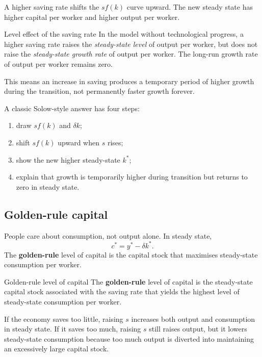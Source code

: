 \documentclass[12pt]{article}
\begin{document}
A higher saving rate shifts the $sf(k)$ curve upward. The new steady state has higher capital per worker and higher output per worker.

\begin{theorem}{Level effect of the saving rate}{}
In the model without technological progress, a higher saving rate raises the \emph{steady-state level} of output per worker, but does not raise the \emph{steady-state growth rate} of output per worker. The long-run growth rate of output per worker remains zero.
\end{theorem}

This means an increase in saving produces a temporary period of higher growth during the transition, not permanently faster growth forever.

\begin{examtip}[title={Exam Focus: High priority for short-answer}]
A classic Solow-style answer has four steps:
\begin{enumerate}[leftmargin=1.5em]
\item draw $sf(k)$ and $\delta k$;
\item shift $sf(k)$ upward when $s$ rises;
\item show the new higher steady-state $k^*$;
\item explain that growth is temporarily higher during transition but returns to zero in steady state.
\end{enumerate}
\end{examtip}

\subsection{Golden-rule capital}

People care about consumption, not output alone. In steady state,
\[
c^*=y^*-\delta k^*.
\]
The \textbf{golden-rule} level of capital is the capital stock that maximises steady-state consumption per worker.

\begin{definition}{Golden-rule level of capital}{}
The \textbf{golden-rule} level of capital is the steady-state capital stock associated with the saving rate that yields the highest level of steady-state consumption per worker.
\end{definition}

If the economy saves too little, raising $s$ increases both output and consumption in steady state. If it saves too much, raising $s$ still raises output, but it lowers steady-state consumption because too much output is diverted into maintaining an excessively large capital stock.
\end{document}
